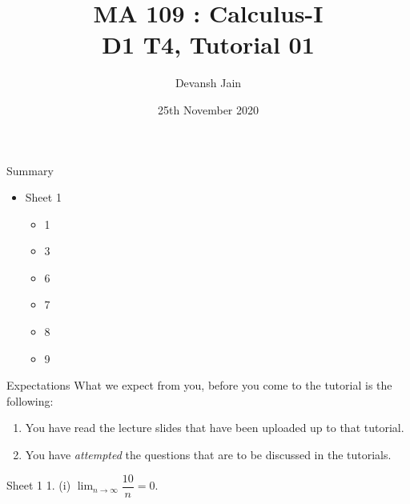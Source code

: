 \documentclass[handout, aspectratio=169]{beamer}
\title{MA 109 : Calculus-I\\ D1 T4, Tutorial 01}
\author{Devansh Jain}
\date[25-11-2020]{25th November 2020}
\institute[IITB]{IIT Bombay}
\newcommand{\fl}[1]{\left\lfloor #1 \right\rfloor}
\begin{document}
\begin{frame}
    \titlepage
\end{frame}

\begin{frame}{Summary}
    \begin{itemize}
        \item Sheet 1
            \begin{itemize}
                \item 1
                \item 3
                \item 6
                \item 7
                \item 8
                \item 9
            \end{itemize}
    \end{itemize}
\end{frame}

\begin{frame}{Expectations}
    What we expect from you, before you come to the tutorial is the following:
    \begin{enumerate}
        \item You have read the lecture slides that have been uploaded up to that tutorial.
        \item You have \textit{attempted} the questions that are to be discussed in the tutorials.
    \end{enumerate}
\end{frame}

\begin{frame}{Sheet 1}
    1. (i) $\displaystyle\lim_{n\to \infty}\dfrac{10}{n} = 0.$\\~\\
    \\
     \\~\\
    \uncover<6->{Let $n_0 = \fl{\dfrac{10}{\epsilon}} + 1.$}
    \\~\\
\end{frame}
\end{document}
